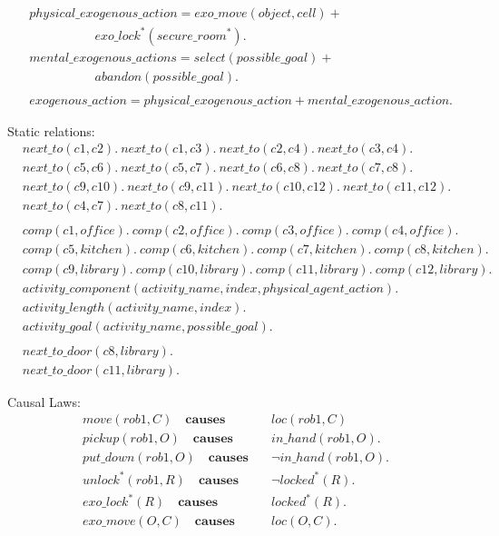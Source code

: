 \documentclass[11pt, oneside]{article}
\begin{document}
\begin{allowdisplaybreaks}
\begin{align*}
&physical\_exogenous\_action = exo\_move(object, cell) + \\
  &\hspace{50pt}\quad exo\_lock^*(secure\_room^*).\\
  &mental\_exogenous\_actions = select(possible\_goal) + \\
&\hspace{50pt}\quad  abandon(possible\_goal).\\
\\
&exogenous\_action = physical\_exogenous\_action + mental\_exogenous\_action.
\end{align*}
\end{allowdisplaybreaks}
 
 Static relations:
\begin{align*}
 & next\_to(c1,c2).\ next\_to(c1,c3).\ next\_to(c2,c4).\ next\_to(c3,c4).\\
 &next\_to(c5,c6).\ next\_to(c5,c7).\ next\_to(c6,c8).\ next\_to(c7,c8).\\
 &next\_to(c9,c10).\ next\_to(c9,c11).\ next\_to(c10,c12).\ next\_to(c11,c12).\\
 &next\_to(c4,c7).\ next\_to(c8,c11).\\
 \\
&comp(c1, office).\ comp(c2, office).\ comp(c3, office).\ comp(c4, office).\\
&comp(c5, kitchen).\ comp(c6, kitchen).\ comp(c7, kitchen).\ comp(c8, kitchen).\\
&comp(c9, library).\ comp(c10, library).\ comp(c11, library).\ comp(c12, library).
\\
  &activity\_component(activity\_name, index, physical\_agent\_action).\\
  &activity\_length(activity\_name, index).\\
  &activity\_goal(activity\_name, possible\_goal).\\
\\
  &next\_to\_door(c8, library).\\
  &next\_to\_door(c11, library).
\end{align*}



Causal Laws:
\begin{align*}
  move(rob1,C)\quad \mathbf{causes}&\quad loc(rob1,C)\\
  pickup(rob1,O)\quad \mathbf{causes}&\quad in\_hand(rob1,O). \\
  put\_down(rob1,O)\quad \mathbf{causes}&\quad \neg in\_hand(rob1,O).\\
  unlock^*(rob1,R)\quad \mathbf{causes}&\quad \neg locked^*(R).\\
  exo\_lock^*(R)\quad \mathbf{causes}&\quad locked^*(R).\\
  exo\_move(O,C)\quad \mathbf{causes}&\quad loc(O,C).\\
\end{align*}
\end{document}
